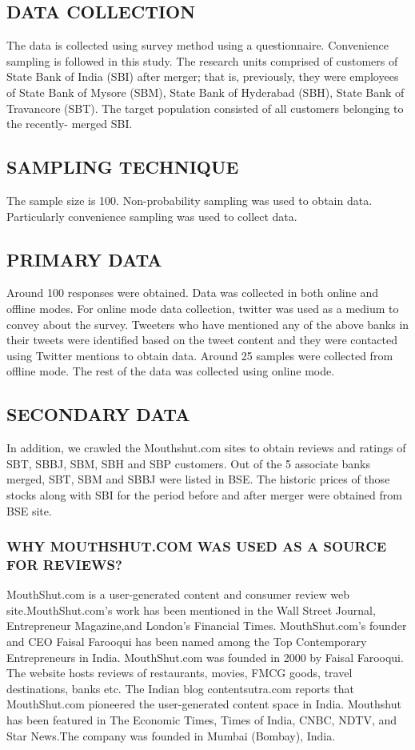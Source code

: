 \documentclass[a4paper, 12pt]{extarticle}
\begin{document}
{\subsection{DATA COLLECTION}
\par The data is collected using survey method using a questionnaire. Convenience sampling is followed in this study. The research units comprised of customers of State Bank of India (SBI) after merger; that is, previously, they were employees of State Bank of Mysore (SBM), State Bank of Hyderabad (SBH), State Bank of Travancore (SBT). The target population consisted of all customers belonging to the recently- merged SBI.
\subsection{SAMPLING TECHNIQUE}
The sample size is 100. Non-probability sampling was used to obtain data. Particularly convenience sampling was used to collect data.
\subsection{PRIMARY DATA}
\par Around 100 responses were obtained. Data was collected in both online and offline modes. For online mode data collection, twitter was used as a medium to convey about the survey. Tweeters who have mentioned any of the above banks in their tweets were identified based on the tweet content and they were contacted using Twitter mentions to obtain data. Around 25 samples were collected from offline mode. The rest of the data was collected using online mode.
\subsection{SECONDARY DATA}
In addition, we crawled the Mouthshut.com sites to obtain reviews and ratings of SBT, SBBJ, SBM, SBH and SBP customers. Out of the 5 associate banks merged, SBT, SBM and SBBJ were listed in BSE. The historic prices of those stocks along with SBI for the period before and after merger were obtained from BSE site.
\subsubsection{WHY MOUTHSHUT.COM WAS USED AS A SOURCE FOR REVIEWS?}
MouthShut.com is a user-generated content and consumer review web site.MouthShut.com's work has been mentioned in the Wall Street Journal, Entrepreneur Magazine,and London's Financial Times. MouthShut.com's founder and CEO Faisal Farooqui has been named among the Top Contemporary Entrepreneurs in India. 
MouthShut.com was founded in 2000 by Faisal Farooqui. The website hosts reviews of restaurants, movies, FMCG goods, travel destinations, banks etc. The Indian blog contentsutra.com reports that MouthShut.com pioneered the user-generated content space in India. Mouthshut has been featured in The Economic Times, Times of India, CNBC, NDTV, and Star News.The company was founded in Mumbai (Bombay), India.  

}
\end{document}
